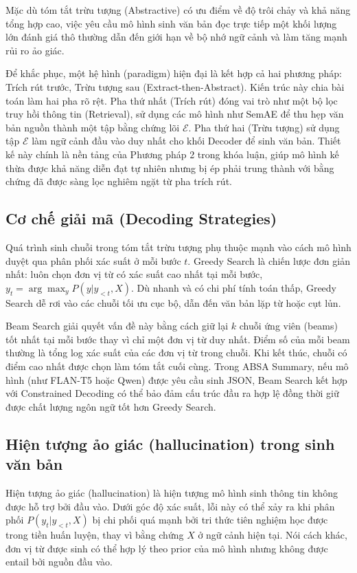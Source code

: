 Mặc dù tóm tắt trừu tượng (Abstractive) có ưu điểm về độ trôi chảy và khả năng tổng hợp cao, việc yêu cầu mô hình sinh văn bản đọc trực tiếp một khối lượng lớn đánh giá thô thường dẫn đến giới hạn về bộ nhớ ngữ cảnh và làm tăng mạnh rủi ro ảo giác.

Để khắc phục, một hệ hình (paradigm) hiện đại là kết hợp cả hai phương pháp: Trích rút trước, Trừu tượng sau (Extract-then-Abstract). Kiến trúc này chia bài toán làm hai pha rõ rệt. Pha thứ nhất (Trích rút) đóng vai trò như một bộ lọc truy hồi thông tin (Retrieval), sử dụng các mô hình như SemAE để thu hẹp văn bản nguồn thành một tập bằng chứng lõi $\mathcal{E}$. Pha thứ hai (Trừu tượng) sử dụng tập $\mathcal{E}$ làm ngữ cảnh đầu vào duy nhất cho khối Decoder để sinh văn bản. Thiết kế này chính là nền tảng của Phương pháp 2 trong khóa luận, giúp mô hình kế thừa được khả năng diễn đạt tự nhiên nhưng bị ép phải trung thành với bằng chứng đã được sàng lọc nghiêm ngặt từ pha trích rút.

\subsection{Cơ chế giải mã (Decoding Strategies)}
\label{subsec:dev-chap2-decoding}

Quá trình sinh chuỗi trong tóm tắt trừu tượng phụ thuộc mạnh vào cách mô hình duyệt qua phân phối xác suất ở mỗi bước $t$. Greedy Search là chiến lược đơn giản nhất: luôn chọn đơn vị từ có xác suất cao nhất tại mỗi bước, $y_t = \arg\max_y P(y|y_{<t},X)$. Dù nhanh và có chi phí tính toán thấp, Greedy Search dễ rơi vào các chuỗi tối ưu cục bộ, dẫn đến văn bản lặp từ hoặc cụt lủn.

Beam Search giải quyết vấn đề này bằng cách giữ lại $k$ chuỗi ứng viên (beams) tốt nhất tại mỗi bước thay vì chỉ một đơn vị từ duy nhất. Điểm số của mỗi beam thường là tổng log xác suất của các đơn vị từ trong chuỗi. Khi kết thúc, chuỗi có điểm cao nhất được chọn làm tóm tắt cuối cùng. Trong ABSA Summary, nếu mô hình (như FLAN-T5 hoặc Qwen) được yêu cầu sinh JSON, Beam Search kết hợp với Constrained Decoding có thể bảo đảm cấu trúc đầu ra hợp lệ đồng thời giữ được chất lượng ngôn ngữ tốt hơn Greedy Search.

\subsection{Hiện tượng ảo giác (hallucination) trong sinh văn bản}
\label{subsec:dev-chap2-hallucination}

Hiện tượng ảo giác (hallucination) là hiện tượng mô hình sinh thông tin không được hỗ trợ bởi đầu vào. Dưới góc độ xác suất, lỗi này có thể xảy ra khi phân phối $P(y_t|y_{<t},X)$ bị chi phối quá mạnh bởi tri thức tiên nghiệm học được trong tiền huấn luyện, thay vì bằng chứng $X$ ở ngữ cảnh hiện tại. Nói cách khác, đơn vị từ được sinh có thể hợp lý theo prior của mô hình nhưng không được entail bởi nguồn đầu vào.

